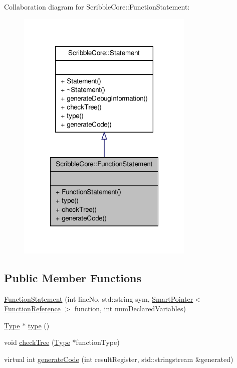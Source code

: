 Collaboration diagram for Scribble\-Core\-:\-:Function\-Statement\-:
\nopagebreak
\begin{figure}[H]
\begin{center}
\leavevmode
\includegraphics[width=240pt]{class_scribble_core_1_1_function_statement__coll__graph}
\end{center}
\end{figure}
\subsection*{Public Member Functions}
\begin{DoxyCompactItemize}
\item 
\hyperlink{class_scribble_core_1_1_function_statement_a817ae8168af58d2c70d8539db2b6982a}{Function\-Statement} (int line\-No, std\-::string sym, \hyperlink{_smart_pointer_8hpp_afdd8d4ba81c3fcbdeacf1dafba2accfb}{Smart\-Pointer}$<$ \hyperlink{class_scribble_core_1_1_function_reference}{Function\-Reference} $>$ function, int num\-Declared\-Variables)
\item 
\hyperlink{class_scribble_core_1_1_type}{Type} $\ast$ \hyperlink{class_scribble_core_1_1_function_statement_aa76d271600b3472b23579f3646b8943c}{type} ()
\item 
void \hyperlink{class_scribble_core_1_1_function_statement_ac9cf13bb2f9f5de5a111bd0e724b4796}{check\-Tree} (\hyperlink{class_scribble_core_1_1_type}{Type} $\ast$function\-Type)
\item 
virtual int \hyperlink{class_scribble_core_1_1_function_statement_adaea8ad07146397495bf37eccff6156c}{generate\-Code} (int result\-Register, std\-::stringstream \&generated)
\end{DoxyCompactItemize}


